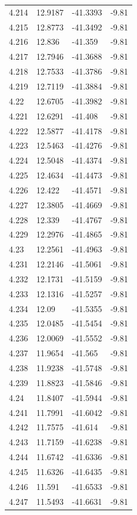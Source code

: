 \begin{tabular}{llll}
4.214 & 12.9187 & -41.3393 & -9.81 \\
4.215 & 12.8773 & -41.3492 & -9.81 \\
4.216 & 12.836 & -41.359 & -9.81 \\
4.217 & 12.7946 & -41.3688 & -9.81 \\
4.218 & 12.7533 & -41.3786 & -9.81 \\
4.219 & 12.7119 & -41.3884 & -9.81 \\
4.22 & 12.6705 & -41.3982 & -9.81 \\
4.221 & 12.6291 & -41.408 & -9.81 \\
4.222 & 12.5877 & -41.4178 & -9.81 \\
4.223 & 12.5463 & -41.4276 & -9.81 \\
4.224 & 12.5048 & -41.4374 & -9.81 \\
4.225 & 12.4634 & -41.4473 & -9.81 \\
4.226 & 12.422 & -41.4571 & -9.81 \\
4.227 & 12.3805 & -41.4669 & -9.81 \\
4.228 & 12.339 & -41.4767 & -9.81 \\
4.229 & 12.2976 & -41.4865 & -9.81 \\
4.23 & 12.2561 & -41.4963 & -9.81 \\
4.231 & 12.2146 & -41.5061 & -9.81 \\
4.232 & 12.1731 & -41.5159 & -9.81 \\
4.233 & 12.1316 & -41.5257 & -9.81 \\
4.234 & 12.09 & -41.5355 & -9.81 \\
4.235 & 12.0485 & -41.5454 & -9.81 \\
4.236 & 12.0069 & -41.5552 & -9.81 \\
4.237 & 11.9654 & -41.565 & -9.81 \\
4.238 & 11.9238 & -41.5748 & -9.81 \\
4.239 & 11.8823 & -41.5846 & -9.81 \\
4.24 & 11.8407 & -41.5944 & -9.81 \\
4.241 & 11.7991 & -41.6042 & -9.81 \\
4.242 & 11.7575 & -41.614 & -9.81 \\
4.243 & 11.7159 & -41.6238 & -9.81 \\
4.244 & 11.6742 & -41.6336 & -9.81 \\
4.245 & 11.6326 & -41.6435 & -9.81 \\
4.246 & 11.591 & -41.6533 & -9.81 \\
4.247 & 11.5493 & -41.6631 & -9.81 \\

\end{tabular}
